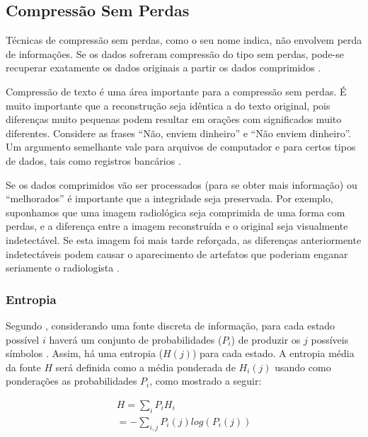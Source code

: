 \subsection{Compressão Sem Perdas}
Técnicas de compressão sem perdas, como o seu nome indica, não envolvem perda de informações. Se os dados sofreram compressão do tipo sem perdas, pode-se recuperar exatamente os dados originais a partir  os dados comprimidos \cite{ukrit2011survey}.

Compressão de texto é uma área importante para a compressão sem perdas. É muito importante que a reconstrução seja idêntica a do texto original, pois diferenças muito pequenas podem resultar em orações com significados muito diferentes. Considere as frases \enquote{Não, enviem dinheiro} e \enquote{Não enviem dinheiro}. Um argumento semelhante vale para arquivos de computador e para certos tipos de dados, tais como registros bancários \cite{sayood2012introduction}.

Se os dados comprimidos vão ser processados (para se obter mais informação) ou \enquote{melhorados} é importante que a integridade seja preservada. Por exemplo, suponhamos que uma imagem radiológica seja comprimida de uma forma com perdas, e a diferença entre a imagem reconstruída e o original seja visualmente indetectável. Se esta imagem foi mais tarde reforçada, as diferenças anteriormente indetectáveis podem causar o aparecimento de artefatos que poderiam enganar seriamente o radiologista \cite{sayood2012introduction}.

\subsubsection{Entropia}

Segundo \cite{shannon2001mathematical}, considerando uma fonte discreta de informação, para cada estado possível $i$ haverá um conjunto de probabilidades ($P_i$) de produzir os $j$ possíveis símbolos . Assim, há uma entropia ($H(j)$) para cada estado. A entropia média da fonte $H$ será definida como a média ponderada de $H_i(j)$ usando como ponderações as probabilidades $P_i$, como mostrado a seguir:

\begin{equation}
\label{ENTROPIA}
	\begin{split}
		H = \sum_i P_iH_i\\
		= - \sum_{i,j} P_i(j) log(P_i(j))
	\end{split}
\end{equation}

